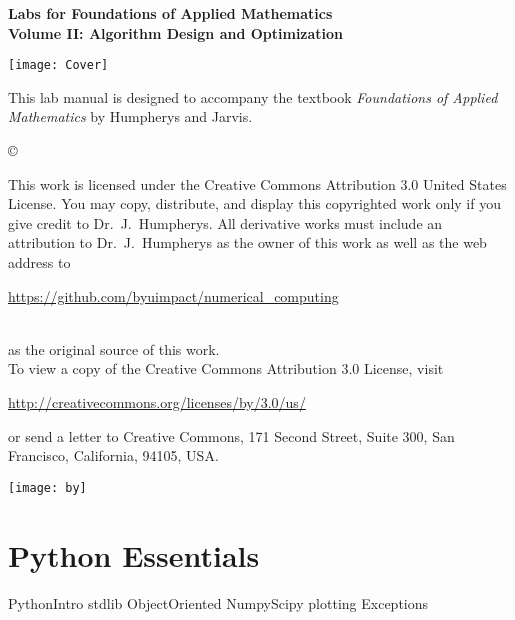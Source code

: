 \documentclass[nociteref]{SIAM-GH-book}
\begin{document}

\thispagestyle{empty} %

\begin{center}
{\huge \bf Labs for Foundations of Applied Mathematics} \\
\vspace{5mm}
{\Large \bf Volume II: Algorithm Design and Optimization}
\vspace{20mm}

\texttt{[image: Cover]}
\end{center}
\frontmatter



\begin{thepreface} %

This lab manual is designed to accompany the textbook \emph{Foundations of Applied Mathematics} by Humpherys and Jarvis.

\vfill
\copyright{This work is licensed under the Creative Commons Attribution 3.0 United States
License.  You may copy, distribute, and display this copyrighted work only if you give
credit to Dr.~J.~Humpherys. All derivative works must include an attribution to Dr.~J.~Humpherys as the owner of this work as well as the web address to
\\\centerline{\url{https://github.com/byuimpact/numerical_computing}}\\ as the original source of
this
work.\\To view a copy of the Creative Commons Attribution 3.0 License,
visit\\\centerline{\url{http://creativecommons.org/licenses/by/3.0/us/}} or send a letter to
Creative Commons, 171 Second Street, Suite 300, San Francisco, California, 94105, USA.}

\vfill
\centering\texttt{[image: by]}
\vfill
\end{thepreface}

\setcounter{tocdepth}{1}
\tableofcontents

\mainmatter


\part{Python Essentials}
{PythonIntro}
{stdlib}
{ObjectOriented}
{NumpyScipy}
{plotting}
{Exceptions}
\end{document}
